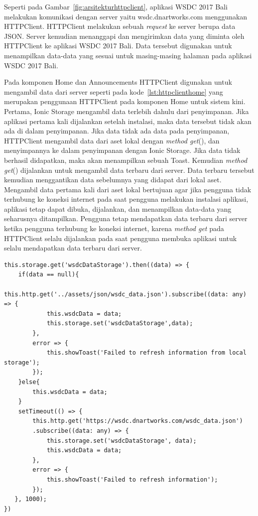 Seperti pada Gambar~\ref{fig:arsitekturhttpclient}, aplikasi WSDC 2017 Bali melakukan komunikasi dengan server yaitu wsdc.dnartworks.com menggunakan HTTPClient. HTTPClient melakukan sebuah \textit{request} ke server berupa data JSON. Server kemudian menanggapi dan mengirimkan data yang diminta oleh HTTPClient ke aplikasi WSDC 2017 Bali. Data tersebut digunakan untuk menampilkan data-data yang sesuai untuk masing-masing halaman pada aplikasi WSDC 2017 Bali. 

Pada komponen Home dan Announcements HTTPClient digunakan untuk mengambil data dari server seperti pada kode~\ref{lst:httpclienthome} yang merupakan penggunaan HTTPClient pada komponen Home untuk sistem kini. Pertama, Ionic Storage mengambil data terlebih dahulu dari penyimpanan. Jika aplikasi pertama kali dijalankan setelah instalasi, maka data tersebut tidak akan ada di dalam penyimpanan. Jika data tidak ada data pada penyimpanan, HTTPClient mengambil data dari aset lokal dengan \textit{method get}(), dan menyimpannya ke dalam penyimpanan dengan Ionic Storage. Jika data tidak berhasil didapatkan, maka akan menampilkan sebuah Toast. Kemudian \textit{method get}() dijalankan untuk mengambil data terbaru dari server. Data terbaru tersebut kemudian menggantikan data sebelumnya yang didapat dari lokal aset. Mengambil data pertama kali dari aset lokal bertujuan agar jika pengguna tidak terhubung ke koneksi internet pada saat pengguna melakukan instalasi aplikasi, aplikasi tetap dapat dibuka, dijalankan, dan menampilkan data-data yang seharusnya ditampilkan. Pengguna tetap mendapatkan data terbaru dari server ketika pengguna terhubung ke koneksi internet, karena \textit{method get} pada HTTPClient selalu dijalankan pada saat pengguna membuka aplikasi untuk selalu mendapatkan data terbaru dari server.
\begin{lstlisting}[label={lst:httpclienthome}, caption=HTTPClient pada Komponen Home]
this.storage.get('wsdcDataStorage').then((data) => {
	if(data == null){
		this.http.get('../assets/json/wsdc_data.json').subscribe((data: any) => {
    		this.wsdcData = data;
        	this.storage.set('wsdcDataStorage',data);       
        },
        error => {
         	this.showToast('Failed to refresh information from local storage');
        });
	}else{    
		this.wsdcData = data;
    }
    setTimeout(() => {
        this.http.get('https://wsdc.dnartworks.com/wsdc_data.json')
        .subscribe((data: any) => {
        	this.storage.set('wsdcDataStorage', data);
          	this.wsdcData = data;
        },
        error => {
          	this.showToast('Failed to refresh information');
        });
   }, 1000);
})
\end{lstlisting} 

